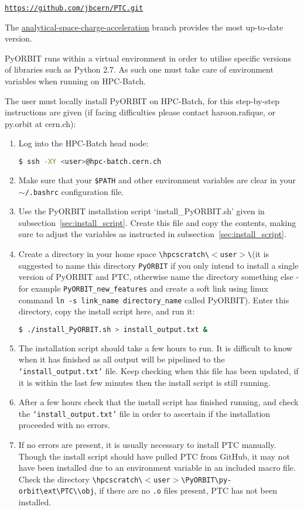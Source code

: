 \documentclass[a4paper]{cernatsnote}
\def \ptcgithub {\href{https://github.com/jbcern/PTC/tree/analytical-space-charge-acceleration}{https://github.com/jbcern/PTC.git}}
\def \batchroot {\texttt{\textbackslash hpcscratch\textbackslash $<$user$>$\textbackslash}}
\def \batchorbitptc {\texttt{\textbackslash hpcscratch\textbackslash $<$user$>$\textbackslash PyORBIT\textbackslash py-orbit\textbackslash ext\textbackslash PTC\textbackslash}}
\begin{document}
	\texttt{\ptcgithub}
	
	The \href{https://github.com/jbcern/PTC/tree/analytical-space-charge-acceleration}{analytical-space-charge-acceleration} branch provides the most up-to-date version.
	
	PyORBIT runs within a virtual environment in order to utilise specific versions of libraries such as Python 2.7. As such one must take care of environment variables when running on HPC-Batch.
	
	The user must locally install PyORBIT on HPC-Batch, for this step-by-step instructions are given (if facing difficulties please contact haroon.rafique, or py.orbit at cern.ch):
	
	\begin{enumerate}
		\item Log into the HPC-Batch head node:
			\begin{lstlisting}[language=bash]
			$ ssh -XY <user>@hpc-batch.cern.ch
			\end{lstlisting}
		\item Make sure that your \texttt{\$PATH} and other environment variables are clear in your \texttt{$\sim$/.bashrc} configuration file.
		\item Use the PyORBIT installation script `install\_PyORBIT.sh' given in subsection~\ref{sec:install_script}. Create this file and copy the contents, making sure to adjust the variables as instructed in subsection~\ref{sec:install_script}.
		\item Create a directory in your home space \batchroot (it is suggested to name this directory \texttt{PyORBIT} if you only intend to install a single version of PyORBIT and PTC, otherwise name the directory something else - for example \texttt{PyORBIT\_new\_features} and create a soft link using linux command \texttt{ln -s link\_name directory\_name} called PyORBIT). Enter this directory, copy the install script here, and run it:
			\begin{lstlisting}[language=bash]
			$ ./install_PyORBIT.sh > install_output.txt &
			\end{lstlisting}
		\item The installation script should take a few hours to run. It is difficult to know when it has finished as all output will be pipelined to the \texttt{`install\_output.txt'} file. Keep checking when this file has been updated, if it is within the last few minutes then the install script is still running.
		\item After a few hours check that the install script has finished running, and check the \texttt{`install\_output.txt'} file in order to ascertain if the installation proceeded with no errors.
		\item If no errors are present, it is usually necessary to install PTC manually. Though the install script should have pulled PTC from GitHub, it may not have been installed due to an environment variable in an included macro file. Check the directory \batchorbitptc \texttt{\textbackslash obj}, if there are no \texttt{.o} files present, PTC has not been installed.
		

\end{enumerate}
\end{document}
